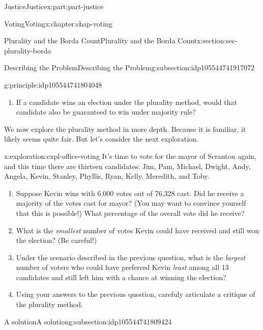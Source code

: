\documentclass[oneside,10pt,]{book}
\numberwithin{equation}{section}
\begin{document}
\begin{partptx}{Justice}{}{Justice}{}{}{x:part:part-justice}
\begin{chapterptx}{Voting}{}{Voting}{}{}{x:chapter:chap-voting}
\begin{sectionptx}{Plurality and the Borda Count}{}{Plurality and the Borda Count}{}{}{x:section:sec-plurality-borda}
\begin{subsectionptx}{Describing the Problem}{}{Describing the Problem}{}{}{g:subsection:idp105544741917072}
\begin{principle}{}{}{g:principle:idp105544741804048}
\begin{enumerate}
\item{}If a candidate wins an election under the plurality method, would that candidate also be guaranteed to win under majority rule?%
\end{enumerate}
\end{principle}
We now explore the plurality method in more depth. Because it is familiar, it likely seems quite fair. But let's consider the next exploration.%
\begin{exploration}{}{x:exploration:expl-office-voting}%
It's time to vote for the mayor of Scranton again, and this time there are thirteen candidates: Jim, Pam, Michael, Dwight, Andy, Angela, Kevin, Stanley, Phyllis, Ryan, Kelly, Meredith, and Toby.%
%
\begin{enumerate}
\item{}Suppose Kevin wins with 6,000 votes out of 76,328 cast. Did he receive a majority of the votes cast for mayor? (You may want to convince yourself that this is possible!) What percentage of the overall vote did he receive?%
\item{}What is the \emph{smallest} number of votes Kevin could have received and still won the election? (Be careful!)%
\item{}Under the scenario described in the previous question, what is the \emph{largest} number of voters who could have preferred Kevin \emph{least} among all 13 candidates and still left him with a chance at winning the election?%
\item{}Using your answers to the previous question, carefuly articulate a critique of the plurality method.%
\end{enumerate}
\end{exploration}%
\end{subsectionptx}
%
%
\typeout{************************************************}
\typeout{************************************************}
%
\begin{subsectionptx}{A solution}{}{A solution}{}{}{g:subsection:idp105544741809424}

\end{subsectionptx}
\end{sectionptx}
\end{chapterptx}
\end{partptx}
\end{document}
